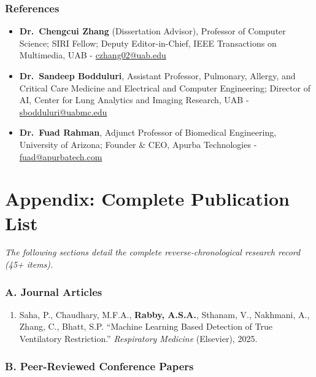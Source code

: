 \documentclass[11pt]{article}
\begin{document}
\section{References}
\begin{itemize}
  \item \textbf{Dr.\ Chengcui Zhang} (Dissertation Advisor), Professor of Computer Science; SIRI Fellow; Deputy Editor-in-Chief, IEEE Transactions on Multimedia, UAB - \href{mailto:czhang02@uab.edu}{czhang02@uab.edu}
  \item \textbf{Dr.\ Sandeep Bodduluri}, Assistant Professor, Pulmonary, Allergy, and Critical Care Medicine and Electrical and Computer Engineering; Director of AI, Center for Lung Analytics and Imaging Research, UAB - \href{mailto:sbodduluri@uabmc.edu}{sbodduluri@uabmc.edu}
  \item \textbf{Dr.\ Fuad Rahman}, Adjunct Professor of Biomedical Engineering, University of Arizona; Founder \& CEO, Apurba Technologies - \href{mailto:fuad@apurbatech.com}{fuad@apurbatech.com}
\end{itemize}

\newpage
\part*{Appendix: Complete Publication List}
\sloppy %
\raggedright %
\noindent
\textit{The following sections detail the complete reverse-chronological research record (45+ items).}

\section*{A. Journal Articles}
\renewcommand{\theenumi}{J\arabic{enumi}}
\begin{enumerate}
    \item Saha, P., Chaudhary, M.F.A., \textbf{Rabby, A.S.A.}, Sthanam, V., Nakhmani, A., Zhang, C., Bhatt, S.P. ``Machine Learning Based Detection of True Ventilatory Restriction.'' \textit{Respiratory Medicine} (Elsevier), 2025.
\end{enumerate}

\section*{B. Peer-Reviewed Conference Papers}
\end{document}
